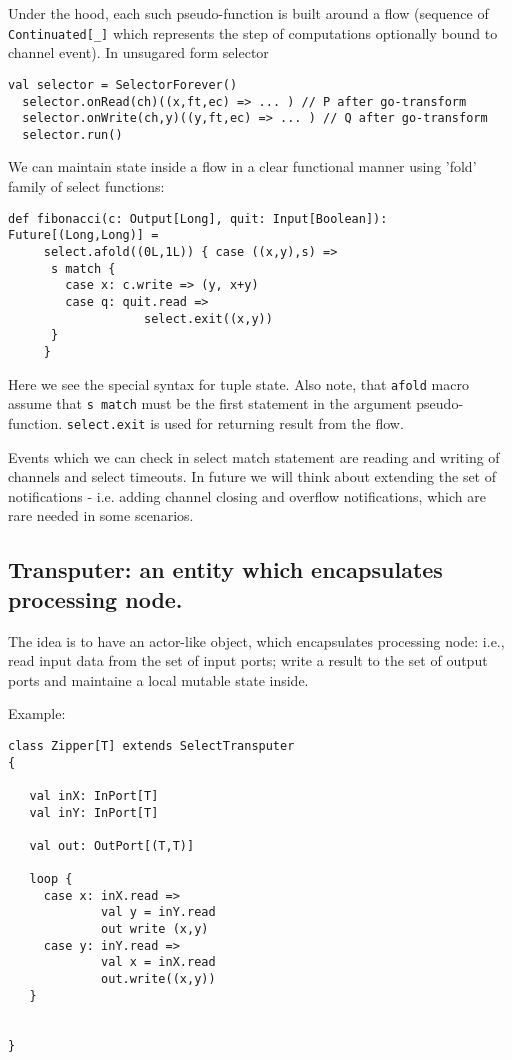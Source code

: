 \documentclass[12pt]{article}
\begin{document}
  Under the hood, each such pseudo-function is built around a flow (sequence of \verb|Continuated[_]| which represents the step of computations optionally bound to channel event).  In unsugared form selector 

\begin{Verbatim}[fontsize=\small]
  val selector = SelectorForever()
  selector.onRead(ch)((x,ft,ec) => ... ) // P after go-transform
  selector.onWrite(ch,y)((y,ft,ec) => ... ) // Q after go-transform
  selector.run()
\end{Verbatim}

 We can maintain state inside a flow in a clear functional manner  using 'fold' family of select functions:

\begin{Verbatim}[fontsize=\small]
  def fibonacci(c: Output[Long], quit: Input[Boolean]): Future[(Long,Long)] =
     select.afold((0L,1L)) { case ((x,y),s) =>
      s match {
        case x: c.write => (y, x+y)
        case q: quit.read =>
                   select.exit((x,y))
      }
     }
\end{Verbatim}

  Here we see the special syntax for tuple state. Also note, that \verb|afold| macro assume that \verb|s match| must be the first statement in the argument pseudo-function. \verb|select.exit| is used for returning result from the flow.
 
  Events which we can check in select match statement are reading and writing of channels and select timeouts. In future we will think about extending the set of notifications - i.e. adding channel closing and overflow notifications, which are rare needed in some scenarios.

\subsection{Transputer: an entity which encapsulates processing node. }

 The idea is to have an actor-like object, which encapsulates processing node: i.e., read input data 
from the set of input ports; write a result to the set of output ports and maintaine a local 
mutable state inside.

Example:

\begin{Verbatim}[fontsize=\small]
class Zipper[T] extends SelectTransputer
{
 
   val inX: InPort[T]
   val inY: InPort[T]

   val out: OutPort[(T,T)] 

   loop {
     case x: inX.read => 
             val y = inY.read
             out write (x,y)
     case y: inY.read =>
             val x = inX.read
             out.write((x,y)) 
   }


}
\end{Verbatim}
\end{document}
